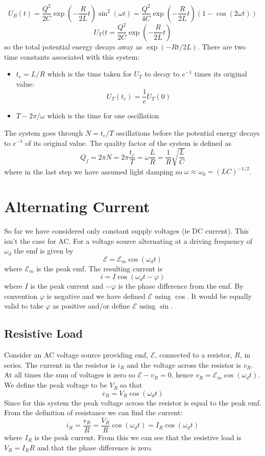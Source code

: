\documentclass{article}
\newcommand{\emf}{\mathcal{E}}
\begin{document}
    \[U_B(t) = \frac{Q^2}{2C}\exp\left(-\frac{R}{2L}t\right)\sin^2(\omega t) = \frac{Q^2}{4C}\exp\left(-\frac{R}{2L}t\right)(1 - \cos(2\omega t))\]
    \[U_T(t = \frac{Q^2}{2C}\exp\left(-\frac{R}{2L}t\right)\]
    so the total potential energy decays away as \(\exp(-Rt/2L)\).
    There are two time constants associated with this system:
    \begin{itemize}
        \item \(t_e = L/R\) which is the time taken for \(U_T\) to decay to \(e^{-1}\) times its original value:
        \[U_T(t_e) = \frac{1}{e}U_T(0)\]
        \item \(T - 2\pi/\omega\) which is the time for one oscillation
    \end{itemize}
    The system goes through \(N = t_e/T\) oscillations before the potential energy decays to \(e^{-1}\) of its original value.
    The quality factor of the system is defined as
    \[Q_f = 2\pi N = 2\pi\frac{t_e}{T} = \omega\frac{L}{R} = \frac{1}{R}\sqrt{\frac{L}{C}}\]
    where in the last step we have assumed light damping so \(\omega \approx \omega_0 = (LC)^{-1/2}\).
    
    \section{Alternating Current}
    So far we have considered only constant supply voltages (ie DC current).
    This isn't the case for AC.
    For a voltage source alternating at a driving frequency of \(\omega_d\) the emf is given by
    \[\emf = \emf_m\cos(\omega_d t)\]
    where \(\emf_m\) is the peak emf.
    The resulting current is
    \[i = I\cos(\omega_d t - \varphi)\]
    where \(I\) is the peak current and \(-\varphi\) is the phase difference from the emf.
    By convention \(\varphi\) is negative and we have defined \(\emf\) using \(\cos\).
    It would be equally valid to take \(\varphi\) as positive and/or define \(\emf\) using \(\sin\).
    
    \subsection{Resistive Load}
    Consider an AC voltage source providing emf, \(\emf\), connected to a resistor, \(R\), in series.
    The current in the resistor is \(i_R\) and the voltage across the resistor is \(v_R\).
    At all times the sum of voltages is zero so \(\emf - v_R = 0\), hence \(v_R = \emf_m\cos(\omega_d t)\).
    We define the peak voltage to be \(V_R\) so that
    \[v_R = V_R\cos(\omega_d t)\]
    Since for this system the peak voltage across the resistor is equal to the peak emf.
    From the definition of resistance we can find the current:
    \begin{equation}\label{eqn:iR}
        i_R = \frac{v_R}{R} = \frac{V_R}{R}\cos(\omega_d t) = I_R\cos(\omega_d t)
    \end{equation}
    where \(I_R\) is the peak current.
    From this we can see that the resistive load is \(V_R = I_RR\) and that the phase difference is zero.
    
\end{document}
